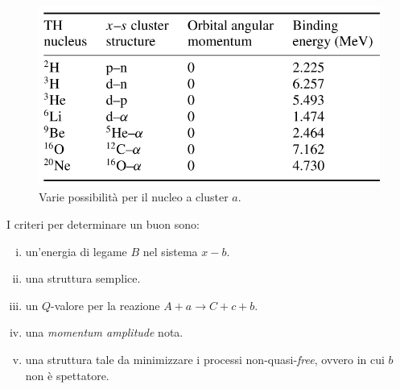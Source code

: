 \begin{figure}[h]
	\centering
	\includegraphics[scale=0.5]{Immagini/0419_tabella.png}
	\caption{Varie possibilità per il nucleo a cluster $a$.}
	\label{0419_tab}
\end{figure}

\noindent I criteri per determinare un buon  sono:
\begin{enumerate}[(i)]
	\item un'energia di legame $B$  nel sistema $x-b$.
	\item una struttura semplice.
	\item un  $Q$-valore per la reazione $A+a\to C+c+b$.
	\item una \textit{momentum amplitude} nota.
	\item una struttura tale da minimizzare i processi non-quasi-\textit{free}, ovvero in cui $b$ non è spettatore.
\end{enumerate}
